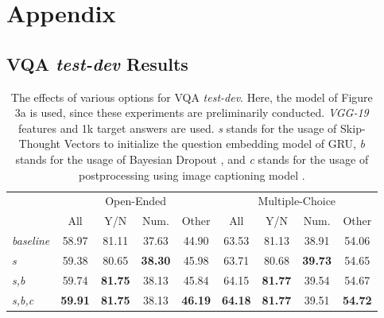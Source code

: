 \section{Appendix}

\subsection{VQA \textit{test-dev} Results}

\begin{table}[h]
\caption{The effects of various options for VQA \textit{test-dev}. Here, the model of Figure 3a is used, since these experiments are preliminarily conducted. \textit{VGG-19} features and 1k target answers are used. \textit{s} stands for the usage of Skip-Thought Vectors \cite{Kiros2015} to initialize the question embedding model of GRU, \textit{b} stands for the usage of Bayesian Dropout \cite{Gal2015}, and \textit{c} stands for the usage of postprocessing using image captioning model \cite{Karpathy}.}
\label{tab:options}
\centering
\begin{tabular}{lcccccccc}
\toprule
& \multicolumn{4}{c}{Open-Ended} & \multicolumn{4}{c}{Multiple-Choice}\\
\cmidrule{2-5}
\cmidrule{6-9}
 & All & Y/N & Num. & Other & All & Y/N & Num. & Other\\
\midrule
  \textit{baseline} & 
     58.97 & 81.11 & 37.63 & 44.90 & 63.53 & 81.13 & 38.91 & 54.06 \\
  \textit{s} & 
     59.38 & 80.65 & \textbf{38.30} & 45.98 & 63.71 & 80.68 & \textbf{39.73} & 54.65 \\
  \textit{s,b} & 
     59.74 & \textbf{81.75} & 38.13 & 45.84 & 64.15 & \textbf{81.77} & 39.54 & 54.67 \\
  \textit{s,b,c} & 
     \textbf{59.91} & \textbf{81.75} & 38.13 & \textbf{46.19} & \textbf{64.18} & \textbf{81.77} & 39.51 & \textbf{54.72} \\
\bottomrule
\end{tabular}
\end{table}

